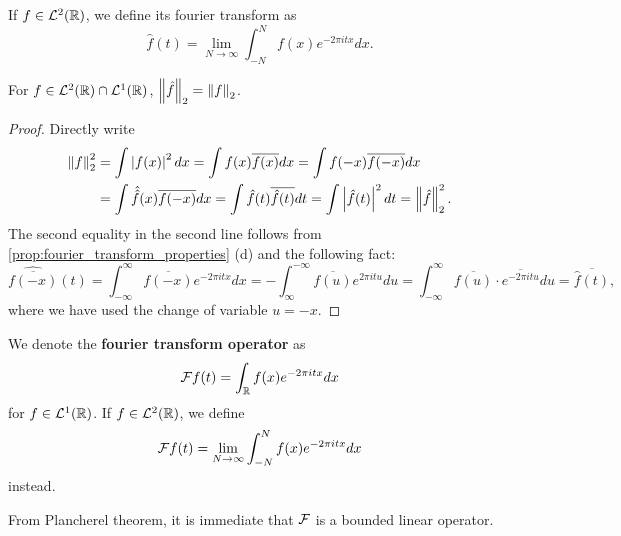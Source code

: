 \begin{definition}
    If $f\in\mathcal{L}^2(\mathbb{R})$, we define its fourier transform as 
    \begin{equation*}
        \hat{f}(t) = \lim_{N\to\infty}\int_{-N}^N f(x)e^{-2\pi itx}dx.
    \end{equation*}
\end{definition}

\begin{theorem}[Plancherel]
    For $f\in\mathcal{L}^2(\mathbb{R})\cap\mathcal{L}^1(\mathbb{R})$, $\left\lVert {\hat{f}} \right\rVert_2 = \left\lVert {f} \right\rVert_2$.
\end{theorem}
\begin{proof}
    Directly write 
    \begin{equation*}
        \begin{split}
            \left\lVert {f} \right\rVert_2^2 &= \int\left\lvert {f(x)} \right\rvert^2dx = \int f(x)\overline{f(x)}dx = \int f(-x)\overline{f(-x)}dx \\
            &= \int \hat{\hat{f}}(x)\overline{f(-x)}dx = \int \hat{f}(t)\overline{\hat{f}(t)}dt 
            = \int \left\lvert {\hat{f}(t)} \right\rvert^2dt = \left\lVert {\hat{f}} \right\rVert_2^2.
        \end{split}
    \end{equation*}
    The second equality in the second line follows from \cref{prop:fourier_transform_properties} (d) 
    and the following fact: 
    \begin{equation*}
        \widehat{\overline{f(-x)}}(t) = \int_{-\infty}^\infty \overline{f(-x)}e^{-2\pi itx}dx 
        = -\int_{\infty}^{-\infty} \overline{f(u)}e^{2\pi itu}du 
        = \int_{-\infty}^{\infty} \overline{f(u)}\cdot\overline{e^{-2\pi itu}}du 
        = \overline{\hat{f}(t)},
    \end{equation*}
    where we have used the change of variable $u = -x$.
\end{proof}

\begin{definition}
    We denote the \textbf{fourier transform operator} as 
    \begin{equation*}
        \mathcal{F} f(t) = \int_{\mathbb{R}}f(x)e^{-2\pi itx}dx
    \end{equation*}
    for $f\in\mathcal{L}^1(\mathbb{R})$. If $f\in\mathcal{L}^2(\mathbb{R})$, we define 
    \begin{equation*}
        \mathcal{F} f(t) = \lim_{N\to\infty}\int_{-N}^N f(x)e^{-2\pi itx}dx
    \end{equation*}
    instead.
\end{definition}
\begin{remark}
    From Plancherel theorem, it is immediate that $\mathcal{F}$ is a bounded linear operator.
\end{remark}

